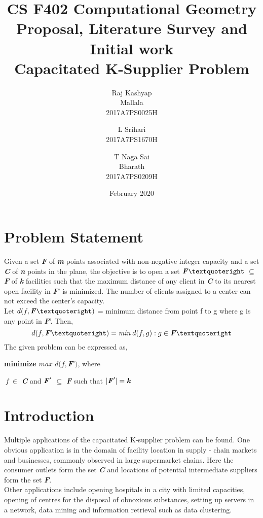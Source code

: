 \documentclass[12pt, a4paper]{article}
\title{%
 \LARGE  CS F402 Computational Geometry
\newline
\newline
\LARGE Proposal, Literature Survey and Initial work\\
\Large Capacitated K-Supplier Problem
}
\author{%
 \begin{tabular}{c} \small Raj Kashyap\\ \small Mallala\\ \small2017A7PS0025H \end{tabular}\and
 \begin{tabular}{c} \small L Srihari\\ \small2017A7PS1670H \end{tabular}\and
 \begin{tabular}{c}\small T Naga Sai\\ \small Bharath\\ \small2017A7PS0209H \end{tabular}
}
\date{February 2020}
\begin{document}
\maketitle
\section{Problem Statement}
Given a set \textbf{\textit{F}} of \textbf{\textit{m}} points associated with non-negative integer capacity and a set \textbf{\textit{C}} of \textbf{\textit{n}} points in the plane, the objective is to open a set $\textbf{\textit{F}}’$ $\subseteq$ \textbf{\textit{F}} of \textbf{\textit{k}} facilities such that the maximum distance of any client in \textbf{\textit{C}} to its nearest open facility in \textbf{\textit{F}}’ is minimized. The number of clients assigned to a center can not exceed the center’s capacity.\\

Let $d(f,\textbf{\textit{F}}’)$ = minimum distance from point f to g where g is any point in  \textbf{\textit{F}}'. Then,
\begin{equation} d(f,\textbf{\textit{F}}’) = \emph{min}\;d(f,g) : g \in \textbf{\textit{F}}’\end{equation}
The given problem can be expressed as,\begin{center}\textbf{minimize} $max\;d(f,$\textbf{\textit{F}}’$)$, where\end{center}
$\;$\textit{f} $\in$  \textbf{\textit{C}} and $\textbf{\textit{F}}'$ $\subseteq$ \textbf{\textit{F}} such that $| \textbf{\textit{F}}' | = \textbf{\textit{k}}$\\

\section{Introduction}
Multiple applications of the capacitated K-supplier problem can be found. One obvious application is in the domain of facility location in supply - chain markets and businesses, commonly observed in large supermarket chains. Here the consumer outlets form the set \textbf{\textit{C}} and locations of potential intermediate suppliers form the set  \textbf{\textit{F}}.\\
Other applications include opening hospitals in a city with limited capacities, opening of centres for the disposal of obnoxious substances, setting up servers in a network, data mining and information retrieval such as data clustering.\\
\end{document}
